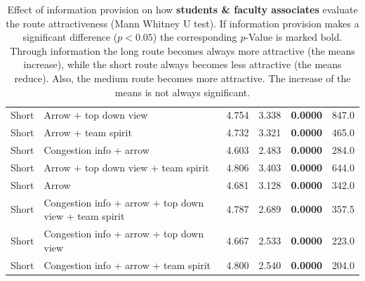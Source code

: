 \begin{table}
\begin{scriptsize}
\begin{tabular}{llrrcc}
   \hline
   Short & Arrow + top down view & 4.754 & 3.338 & \textbf{0.0000} & 847.0 \\ 
   Short & Arrow + team spirit & 4.732 & 3.321 & \textbf{0.0000} & 465.0 \\ 
   Short & Congestion info + arrow & 4.603 & 2.483 & \textbf{0.0000} & 284.0 \\ 
   Short & Arrow + top down view + team spirit & 4.806 & 3.403 & \textbf{0.0000} & 644.0 \\ 
   Short & Arrow & 4.681 & 3.128 & \textbf{0.0000} & 342.0 \\ 
   Short & Congestion info + arrow + top down view + team spirit & 4.787 & 2.689 & \textbf{0.0000} & 357.5 \\ 
   Short & Congestion info + arrow + top down view & 4.667 & 2.533 & \textbf{0.0000} & 223.0 \\ 
   Short & Congestion info + arrow + team spirit & 4.800 & 2.540 & \textbf{0.0000} & 204.0 \\ 
   \hline
\end{tabular}
\end{scriptsize}
\caption{Effect of information provision on how \textbf{students \& faculty associates} evaluate the route attractiveness (Mann Whitney U test). If information provision makes a significant difference ($p<0.05$) the corresponding \textit{p}-Value is marked bold. Through information the long route becomes always more attractive (the means increase), while the short route always becomes less attractive (the means reduce). Also, the medium route becomes more attractive. The increase of the means is not always significant.}
\label{tab:surveyS2C}
\end{table}




